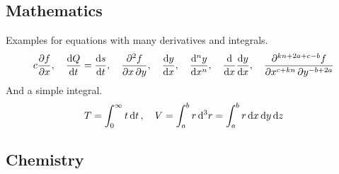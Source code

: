 \documentclass{./class/minimalthesis}
\begin{document}
			\subsection{Mathematics}
				Examples for equations with many derivatives and integrals.
				\begin{align*}{c}
					\pdv{f}{x}, \quad \odv{Q}{t}=\odv{s}{t}, \quad \pdv{f}{x,y}, \quad 
					\derivset{\odv}[switch-*=false] \odv{y}{x}, \quad \odv[order=n]{y}{x}, \quad
					\derivset{\odv}[] \odv*{\odv{y}{x}}{x}, \quad 
					\derivset{\pdv}[sort-method={sign,symbol,abs}] \pdv[order={c+kn,-b+2a}]{f}{x,y}
				\end{align*}
				And a simple integral.
				\begin{align*}
					T = \int_{0}^{\infty}t\dd{t}, \quad V = \int_{a}^{b} r \dd[3]{r} = \int_{a}^{b} r \odif{x,y,z}
				\end{align*}
				
			\subsection{Chemistry}
				\\
	
	\mtGenerateBibliography
\end{document}
